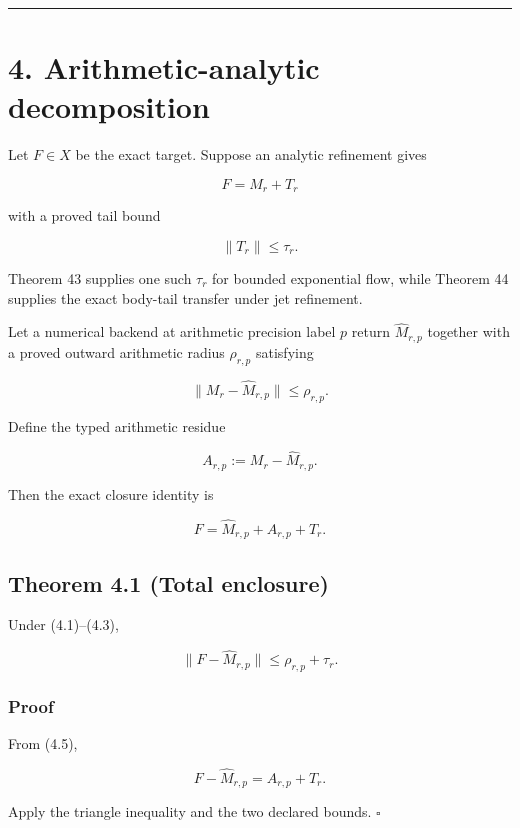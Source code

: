 \begin{center}\rule{0.5\linewidth}{0.5pt}\end{center}

\hypertarget{arithmetic-analytic-decomposition}{%
\section{4. Arithmetic-analytic decomposition}\label{arithmetic-analytic-decomposition}}

Let \(F\in X\) be the exact target. Suppose an analytic refinement gives

\[
\boxed{F=M_r+T_r}
\tag{4.1}
\]

with a proved tail bound

\[
\boxed{\|T_r\|\le\tau_r.}
\tag{4.2}
\]

Theorem 43 supplies one such \(\tau_r\) for bounded exponential flow, while
Theorem 44 supplies the exact body-tail transfer under jet refinement.

Let a numerical backend at arithmetic precision label \(p\) return
\(\widehat M_{r,p}\) together with a proved outward arithmetic radius
\(\rho_{r,p}\) satisfying

\[
\boxed{\|M_r-\widehat M_{r,p}\|\le\rho_{r,p}.}
\tag{4.3}
\]

Define the typed arithmetic residue

\[
A_{r,p}:=M_r-\widehat M_{r,p}.
\tag{4.4}
\]

Then the exact closure identity is

\[
\boxed{F=\widehat M_{r,p}+A_{r,p}+T_r.}
\tag{4.5}
\]

\hypertarget{theorem-4.1-total-enclosure}{%
\subsection{Theorem 4.1 (Total enclosure)}\label{theorem-4.1-total-enclosure}}

Under (4.1)--(4.3),

\[
\boxed{
\|F-\widehat M_{r,p}\|
\le
\rho_{r,p}+\tau_r.
}
\tag{4.6}
\]

\hypertarget{proof}{%
\subsubsection{Proof}\label{proof}}

From (4.5),

\[
F-\widehat M_{r,p}=A_{r,p}+T_r.
\]

Apply the triangle inequality and the two declared bounds. \(\square\)

